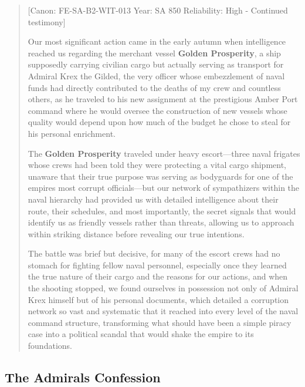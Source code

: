 \begin{quote}
{[}Canon: FE-SA-B2-WIT-013 \textbar{} Year: SA 850 \textbar{}
Reliability: High - Continued testimony{]}

Our most significant action came in the early autumn when intelligence
reached us regarding the merchant vessel \textbf{Golden Prosperity}, a
ship supposedly carrying civilian cargo but actually serving as
transport for Admiral Krex the Gilded, the very officer whose
embezzlement of naval funds had directly contributed to the deaths of my
crew and countless others, as he traveled to his new assignment at the
prestigious Amber Port command where he would oversee the construction
of new vessels whose quality would depend upon how much of the budget he
chose to steal for his personal enrichment.

The \textbf{Golden Prosperity} traveled under heavy escort---three naval
frigates whose crews had been told they were protecting a vital cargo
shipment, unaware that their true purpose was serving as bodyguards for
one of the empire\textquotesingle s most corrupt officials---but our
network of sympathizers within the naval hierarchy had provided us with
detailed intelligence about their route, their schedules, and most
importantly, the secret signals that would identify us as friendly
vessels rather than threats, allowing us to approach within striking
distance before revealing our true intentions.

The battle was brief but decisive, for many of the escort crews had no
stomach for fighting fellow naval personnel, especially once they
learned the true nature of their cargo and the reasons for our actions,
and when the shooting stopped, we found ourselves in possession not only
of Admiral Krex himself but of his personal documents, which detailed a
corruption network so vast and systematic that it reached into every
level of the naval command structure, transforming what should have been
a simple piracy case into a political scandal that would shake the
empire to its foundations.
\end{quote}

\subsection{The Admiral\textquotesingle s
Confession}\label{the-admirals-confession}

